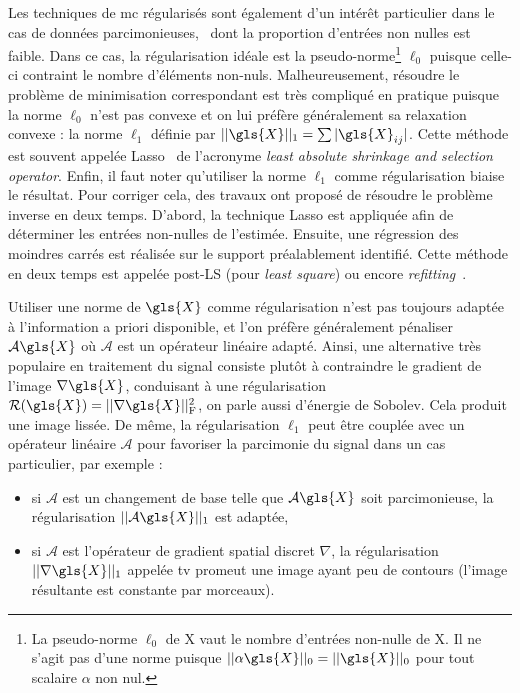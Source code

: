 Les techniques de \gls{mc} régularisés sont également d'un intérêt particulier dans le cas de données  parcimonieuses, \ie\ dont la proportion d'entrées non nulles est faible. Dans ce cas, la régularisation idéale est la pseudo-norme\footnote{La pseudo-norme $\ell_0$ de \gls{X} vaut le nombre d'entrées non-nulle de \gls{X}. Il ne s'agit pas d'une norme puisque $||\alpha\gls{X}||_0 = ||\gls{X}||_0$ pour tout scalaire $\alpha$ non nul.} $\ell_0$ puisque celle-ci contraint le nombre d'éléments non-nuls. Malheureusement, résoudre le problème de minimisation correspondant est très compliqué en pratique puisque la norme $\ell_0$ n'est pas convexe et on lui préfère généralement sa relaxation convexe : la norme $\ell_1$ définie par $||\gls{X}||_1 = \sum |\gls{X}_{ij}|$. Cette méthode est souvent appelée Lasso~\cite{tibshirani1996regression} de l'acronyme \emph{least absolute shrinkage and selection operator}. Enfin, il faut noter qu'utiliser la norme $\ell_1$ comme régularisation biaise le résultat. Pour corriger cela, des travaux ont proposé de résoudre le problème inverse en deux temps. D'abord, la technique Lasso est appliquée afin de déterminer les entrées non-nulles de l'estimée. Ensuite, une régression des moindres carrés est réalisée sur le support préalablement identifié. Cette méthode en deux temps est appelée post-LS (pour \textit{least square}) ou encore \emph{refitting}~\cite{belloni2013least, lederer2013trust, deledalle2017clear}.

Utiliser une norme de $\gls{X}$ comme régularisation n'est pas toujours adaptée à l'information a priori disponible,  et l'on préfère généralement pénaliser $\mathcal{A}\gls{X}$ où $\mathcal{A}$ est un opérateur linéaire adapté. Ainsi, une alternative très populaire en traitement du signal consiste plutôt à contraindre le gradient de l'image $\nabla\gls{X}$, conduisant à une régularisation $\mathcal{R}(\gls{X})=\frobnorm{\nabla\gls{X}}$, on parle aussi d'énergie de Sobolev. Cela produit une image lissée. De même, la régularisation $\ell_1$ peut être couplée avec un opérateur linéaire $\mathcal{A}$ pour favoriser la parcimonie du signal dans un cas particulier, par exemple :
\begin{itemize}
    \item si $\mathcal{A}$ est un changement de base telle que $\mathcal{A}\gls{X}$ soit parcimonieuse, la régularisation $||\mathcal{A}\gls{X}||_1$ est adaptée,
    \item si $\mathcal{A}$ est l'opérateur de gradient spatial discret $\nabla$, la régularisation $||\nabla \gls{X}||_1$ appelée \gls{tv} promeut une image ayant peu de contours (l'image résultante est constante par morceaux).
\end{itemize}


